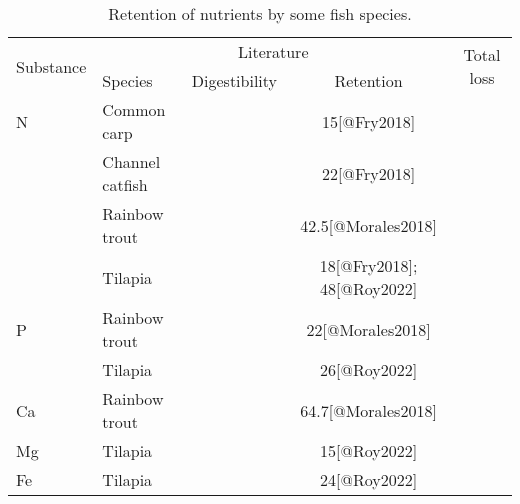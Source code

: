 \begin{table}
\centering
  \begin{threeparttable}
  
  \caption{Retention of nutrients by some fish species.}
  \label{tab:retention}
  
    \begin{tabularx}{\textwidth}{Xlccc}
    
    \toprule
    
    \multirow{2}{*}{Substance}
    & \multicolumn{3}{c}{Literature}
    & \multirow{2}{*}{Total loss}
    \\
    
    \cmidrule(lr){2-4}
    
    
    & Species
    & Digestibility
    & Retention
    & 
    \\
    
    \midrule
    
    N
    & Common carp
    & 
    & \SI{15}{\p}[@Fry2018]
    &
    \\
    
    
    & Channel catfish
    &
    & \SI{22}{\p}[@Fry2018] 
    &
    \\
    
    
    & Rainbow trout
    &
    & \SI{42.5}{\p}[@Morales2018]
    &
    \\
    
    
    & Tilapia
    &
    & \SI{18}{\p}[@Fry2018]; \SI{48}{\p}\tnote{†}[@Roy2022]
    &
    \\
    
    \addlinespace
    
    P
    & Rainbow trout
    &
    & \SI{22}{\p}[@Morales2018]
    &
    \\
    
    
    & Tilapia
    &
    & \SI{26}{\p}[@Roy2022]
    & 
    \\
    
    \addlinespace
    
    Ca
    & Rainbow trout
    &
    & \SI{64.7}{\p}[@Morales2018]
    &
    \\
    
    \addlinespace
    
    Mg
    & Tilapia
    &
    & \SI{15}{\p}[@Roy2022]
    &
    \\
    
    \addlinespace
    
    Fe
    & Tilapia
    &
    & \SI{24}{\p}[@Roy2022]
    &
    \\
    

\end{tabularx}
\end{threeparttable}
\end{table}
